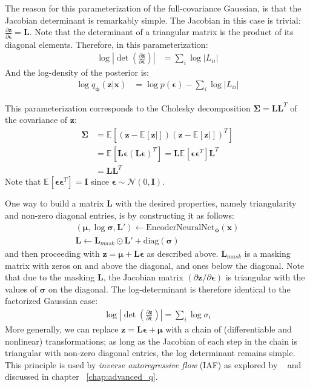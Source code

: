 \documentclass[MAL,biber]{nowfnt} %
\newcommand{\bb}[1]{\mathbf{#1}}
\newcommand{\bx}{\bb{x}}
\newcommand{\bz}{\bb{z}}
\newcommand{\bphi}{\boldsymbol{\phi}}
\newcommand{\beps}{\boldsymbol{\epsilon}}
\newcommand{\bsigma}{\boldsymbol{\sigma}}
\newcommand{\bmu}{\boldsymbol{\mu}}
\newcommand{\bL}{\bb{L}}
\newcommand{\bI}{\bb{I}}
\newcommand{\qP}{q_{\bphi}}
\newcommand{\EncoderNeuralNet}{\text{EncoderNeuralNet}_{\bphi}}
\newcommand{\Exp}[2]{\mathbb{E}_{#1}\left[#2\right]}
\begin{document}
The reason for this parameterization of the full-covariance Gaussian, is that the Jacobian determinant is remarkably simple. The Jacobian in this case is trivial: $\frac{\partial \bz}{\partial \beps} = \bL$. Note that the determinant of a triangular matrix is the product of its diagonal elements. Therefore, in this parameterization:
\begin{align}
\log | \det(\frac{\partial \bz}{\partial \beps}) | &= \sum_i \log |L_{ii}|
\end{align}
And the log-density of the posterior is:
\begin{align}
\log \qP(\bz|\bx) &= \log p(\beps) - \sum_i \log |L_{ii}|
\end{align}

This parameterization corresponds to the Cholesky decomposition $\boldsymbol{\Sigma} = \bL \bL^T$ of the covariance of $\bz$:
\begin{align}
\boldsymbol{\Sigma}
&= \Exp{}{(\bz - \Exp{}{\bz|}) (\bz - \Exp{}{\bz|})^T}\\
&= \Exp{}{\bL \beps (\bL \beps)^T} = \bL \Exp{}{\beps \beps^T} \bL^T\\ 
&= \bL \bL^T
\end{align}
Note that $\Exp{}{\beps \beps^T} = \bI$ since $\beps \sim \mathcal{N}(0, \bI)$.

One way to build a matrix $\bL$ with the desired properties, namely triangularity and non-zero diagonal entries, is by constructing it as follows:
\begin{align}
(\bmu, \log \bsigma, \bL') \leftarrow \EncoderNeuralNet(\bx)\\
\bL \leftarrow \bL_{mask} \odot \bL' + \text{diag}(\bsigma)
\end{align}
and then proceeding with $\bz = \bmu + \bL \beps$ as described above. $\bL_{mask}$ is a masking matrix with zeros on and above the diagonal, and ones below the diagonal. Note that due to the masking $\bL$, the Jacobian matrix $(\partial \bz / \partial \beps)$ is triangular with the values of $\bsigma$ on the diagonal. The log-determinant is therefore identical to the factorized Gaussian case:
\begin{align}
\log \left| \det \left(\frac{\partial \bz}{\partial \beps}\right) \right| = \sum_i \log \sigma_i
\label{eq:fullgausslogdet}
\end{align}
More generally, we can replace $\bz = \bL \beps + \bmu$ with a chain of (differentiable and nonlinear) transformations; as long as the Jacobian of each step in the chain is triangular with non-zero diagonal entries, the log determinant remains simple. This principle is used by \emph{inverse autoregressive flow} (IAF) as explored by ~\cite{kingma2016improving} and discussed in chapter ~\ref{chap:advanced_q}.
\end{document}
